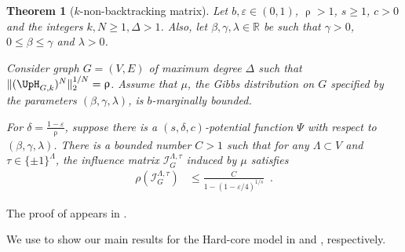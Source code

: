 \documentclass[11pt,reqno]{amsart}
\numberwithin{equation}{section}
\newtheorem{theorem}{Theorem}[section]
\newcommand{\cI}{{\mathcal{I}}}
\newcommand{\bluepigment}[1]{{\color{blue(pigment)}#1}}
\newcommand{\cadmiumgreen}[1]{{\color{cadmiumgreen}#1}}
\newcommand{\darkmagenta}[1]{{\color{darkmagenta}#1}}
\newcommand{\goldenbrown}[1]{{\color{goldenbrown}#1}}
\newcommand{\maxDeg}{{\Delta}}
\newcommand{\potF}{{\Psi}}
\newcommand{\pfs}{\darkmagenta{s}}
\newcommand{\infmatrix}{\cI}
\newcommand{\spradius}{{\rho}}
\newcommand{\nnorm}[3]{\goldenbrown{\|} #1\goldenbrown{\|}^{#2}_{#3}}
\newcommand{\NBMatrix}{\cadmiumgreen{\UpH}_{G,\kk}}
\renewcommand{\bluepigment}[1]{#1}
\renewcommand{\cadmiumgreen}[1]{#1}
\renewcommand{\darkmagenta}[1]{#1}
\renewcommand{\goldenbrown}[1]{#1}
\newcommand{\kk}{\bluepigment{k}}
\renewcommand{\kk}{k}
\newcommand{\SingBound}{\uprho}
\begin{document}
\begin{theorem}[$k$-non-backtracking matrix]\label{thrm:NonBacktrackingPotentialSpIn}
 Let $b,\varepsilon\in (0,1)$, $\SingBound> 1$, $\pfs \geq 1$, $c>0$ and 
 the integers $\kk,N \geq 1, \maxDeg > 1$.
%
Also, let $\beta,\gamma, \lambda\in \mathbb{R}$ be such that $\gamma >0$,
$0\leq \beta\leq \gamma$ and $\lambda>0$. 


Consider graph $G=(V,E)$ of maximum degree $\maxDeg$ such that 
$\nnorm{ (\NBMatrix)^N}{1/N}{2}= \SingBound$.
%
Assume that $\mu$, the Gibbs distribution on $G$ specified by the parameters $(\beta, \gamma, \lambda)$,
is $b$-marginally bounded.


For $\delta= \frac{1-\varepsilon}{\SingBound}$, suppose  there
is a $(\pfs,\delta,c)$-potential function $\potF$ with respect to $(\beta,\gamma,\lambda)$. 
%
There is a bounded number $C>1$ such that for any
$\Lambda\subset V$ and $\tau\in \{\pm 1\}^{\Lambda}$, the influence matrix
$\infmatrix^{\Lambda,\tau}_{G}$ induced by $\mu$ satisfies 
%
%
{\small
\begin{align}\nonumber 
 \spradius \left( \infmatrix^{\Lambda,\tau}_{G} \right) &\leq 
 \frac{C}{1-(1-\varepsilon/4)^{1/\pfs}} \enspace. 
\end{align}
}
\end{theorem}
The proof of  appears in .




We use  to show our
main results for the Hard-core model in  and , respectively. 
\end{document}
